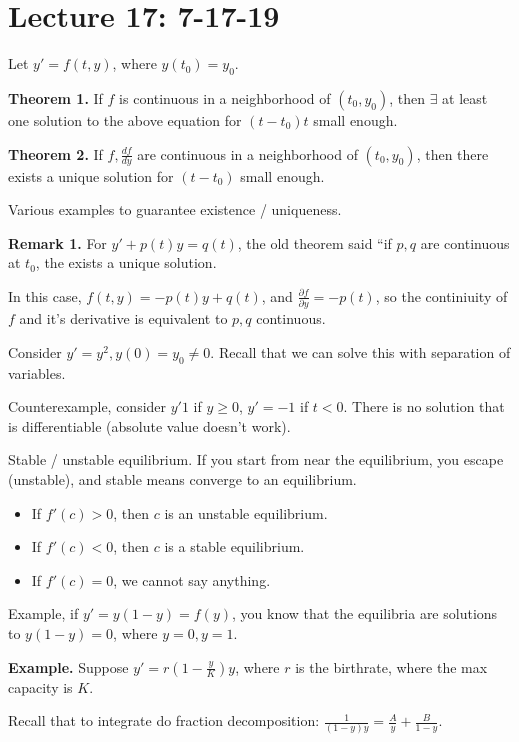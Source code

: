 \documentclass{article}
\begin{document}
\section{Lecture 17: 7-17-19}

Let $y' = f(t, y)$, where $y(t_0) = y_0$.

{\bf Theorem 1.} If $f$ is continuous in a neighborhood of $(t_0, y_0)$, then $\exists $ at least one solution to the above equation for $(t-t_0)t$ small enough.

{\bf Theorem 2.} If $f, \frac{df}{dy}$ are continuous in a neighborhood of $(t_0, y_0)$, then there exists a unique solution for $(t - t_0)$ small enough.

Various examples to guarantee existence / uniqueness.

{\bf Remark 1.} For $y' + p(t) y = q(t)$, the old theorem said ``if $p, q$ are continuous at $t_0$, the exists a unique solution.

In this case, $f(t, y) = -p(t) y + q(t)$, and $\frac{\partial f}{\partial y} = - p(t)$, so the continiuity of $f$ and it's derivative is equivalent to $p, q$ continuous.

Consider $y' = y^2, y(0) = y_0 \neq 0$.  Recall that we can solve this with separation of variables.

Counterexample, consider $y'  1$ if $y \geq 0$, $y' = -1$ if $t < 0$.  There is no solution that is differentiable (absolute value doesn't work).

Stable / unstable equilibrium.  If you start from near the equilibrium, you escape (unstable), and stable means converge to an equilibrium.

\begin{itemize}
  \item If $f'(c) > 0$, then $c$ is an unstable equilibrium.
  \item If $f'(c) < 0$, then $c$ is a stable equilibrium.
  \item If $f'(c) = 0$, we cannot say anything.
\end{itemize}

Example, if $y' = y(1 - y) = f(y)$, you know that the equilibria are solutions to $y(1-y) = 0$, where $y = 0, y = 1$.

{\bf Example.} Suppose $y' = r \left( 1 - \frac{y}{K} \right) y$, where $r$ is the birthrate, where the max capacity is $K$.

Recall that to integrate do fraction decomposition: $\frac{1}{(1-y)y} = \frac{A}{y} + \frac{B}{1-y}$.
\end{document}
